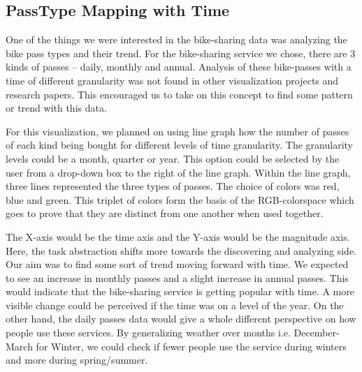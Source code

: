 \subsection{PassType Mapping with Time}
\label{sec:viz2}

One of the things we were interested in the bike-sharing data was analyzing the bike pass types and their trend. For the bike-sharing service we chose, there are 3 kinds of passes -- daily, monthly and annual. Analysis of these bike-passes with a time of different granularity was not found in other visualization projects and research papers. This encouraged us to take on this concept to find some pattern or trend with this data. 

For this visualization, we planned on using line graph how the number of passes of each kind being bought for different levels of time granularity. The granularity levels could be a month, quarter or year. This option could be selected by the user from a drop-down box to the right of the line graph. Within the line graph, three lines represented the three types of passes. The choice of colors was red, blue and green. This triplet of colors form the basis of the RGB-colorspace which goes to prove that they are distinct from one another when used together. 

The X-axis would be the time axis and the Y-axis would be the magnitude axis. Here, the task abstraction shifts more towards the discovering and analyzing side. Our aim was to find some sort of trend moving forward with time. We expected to see an increase in monthly passes and a slight increase in annual passes. This would indicate that the bike-sharing service is getting popular with time. A more visible change could be perceived if the time was on a level of the year. On the other hand, the daily passes data would give a whole different perspective on how people use these services. By generalizing weather over months i.e. December-March for Winter, we could check if fewer people use the service during winters and more during spring/summer. 

